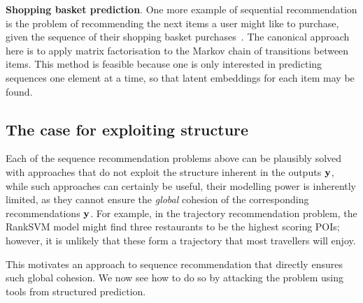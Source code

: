 %
\textbf{Shopping basket prediction}.
One more example of sequential recommendation is the problem of recommending the next items a user might like to purchase, given the sequence of their shopping basket purchases~\citep{Rendle:2010,Wang:2015}.
The canonical approach here is to apply matrix factorisation to the Markov chain of transitions between items.
This method is feasible because one is only interested in predicting sequences one element at a time, so that latent embeddings for each item may be found.


%
\subsection{The case for exploiting structure}

Each of the sequence recommendation problems above can be plausibly solved with approaches that do not exploit the structure inherent in the outputs $\mathbf{y}$,%
while such approaches can certainly be useful,
their modelling power is inherently limited,
as
they cannot ensure the \emph{global} cohesion of the corresponding recommendations $\mathbf{y}$.
For example, in the trajectory recommendation problem, the RankSVM model %
might find three restaurants to be the highest scoring POIs;
however, it is unlikely that these form a trajectory that most travellers will enjoy.

This motivates an approach to sequence recommendation that directly ensures such global cohesion.
We now see how to do so by attacking the problem using tools from structured prediction.



%

